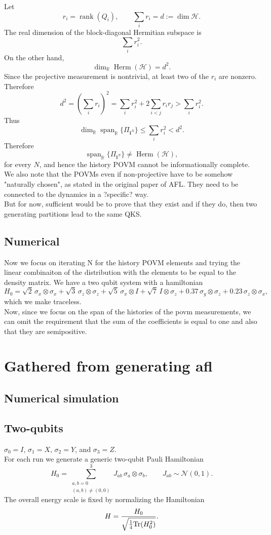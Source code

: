 \documentclass{article}
\begin{document}
Let
\[
r_i=\operatorname{rank}(Q_i),
\qquad
\sum_i r_i=d:=\dim\mathcal{H}.
\]
The real dimension of the block-diagonal Hermitian subspace is
\[
\sum_i r_i^2.
\]
On the other hand,
\[
\dim_{\mathbb{R}}\operatorname{Herm}(\mathcal{H})=d^2.
\]
Since the projective measurement is nontrivial, at least two of the
$r_i$ are nonzero. Therefore
\[
d^2
=
\left(\sum_i r_i\right)^2
=
\sum_i r_i^2
+
2\sum_{i<j}r_ir_j
>
\sum_i r_i^2.
\]
Thus
\[
\dim_{\mathbb{R}}
\operatorname{span}_{\mathbb{R}}
\{\Pi_{\mathbf{i}^N}\}
\leq
\sum_i r_i^2
<
d^2.
\]
Therefore
\[
\operatorname{span}_{\mathbb{R}}
\{\Pi_{\mathbf{i}^N}\}
\neq
\operatorname{Herm}(\mathcal{H}),
\]
for every $N$, and hence the history POVM cannot be informationally complete.\\
We also note that the POVMs even if non-projective have to be somehow "naturally chosen", as stated in the original paper of AFL. They need to be connected to the dynamics in a ?specific? way. \\
But for now, sufficient would be to prove that they exist and if they do, then two generating partitions lead to the same QKS.
\subsection{Numerical}
Now we focus on iterating N for the history POVM elements and trying the linear combinaiton of the distribution with the elements to be equal to the density matrix. We have a two qubit system with a hamiltonian
\begin{equation}
H_0
=
\sqrt{2}\,\sigma_x\otimes\sigma_x
+
\sqrt{3}\,\sigma_z\otimes\sigma_z
+
\sqrt{5}\,\sigma_x\otimes I
+
\sqrt{7}\,I\otimes\sigma_z
+
0.37\,\sigma_y\otimes\sigma_z
+
0.23\,\sigma_z\otimes\sigma_x,
\end{equation}
which we make traceless.\\
Now, since we focus on the span of the histories of the povm measurements, we can omit the requirement that the sum of the coefficients is equal to one and also that they are semipositive. 
\section{Gathered from generating afl}

\subsection{Numerical simulation}
\subsection{Two-qubits}
$\sigma_0=I$, $\sigma_1=X$, $\sigma_2=Y$, and $\sigma_3=Z$.\\
For each run we generate a generic two-qubit Pauli Hamiltonian
\begin{equation}
H_0=\sum_{\substack{a,b=0\\(a,b)\neq(0,0)}}^3
J_{ab}\,\sigma_a\otimes\sigma_b,
\qquad
J_{ab}\sim\mathcal N(0,1).
\end{equation}
The overall energy scale is fixed by normalizing the Hamiltonian
\begin{equation}
H=\frac{H_0}{\sqrt{\frac14\text{Tr}(H_0^2)}}.
\end{equation}
\end{document}
